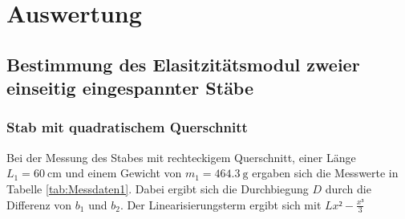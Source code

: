 \section{Auswertung}
\label{sec:Auswertung}

\subsection{Bestimmung des Elasitzitätsmodul zweier einseitig eingespannter Stäbe}

\subsubsection{Stab mit quadratischem Querschnitt}

Bei der Messung des Stabes mit rechteckigem Querschnitt, einer Länge 
$L_1= \SI{60}{\centi\meter}$ und einem Gewicht von $m_1 = \SI{464.3}{\gram}$
ergaben sich die Messwerte in Tabelle \ref{tab:Messdaten1}. Dabei ergibt sich 
die Durchbiegung $D$ durch die Differenz von $b_1$ und $b_2$. Der 
Linearisierungsterm ergibt sich mit $Lx²-\frac{x³}{3}$


